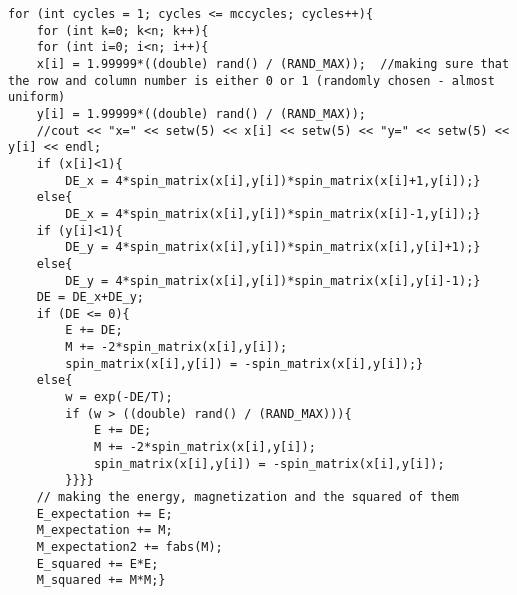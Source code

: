 \begin{lstlisting}
for (int cycles = 1; cycles <= mccycles; cycles++){
    for (int k=0; k<n; k++){
    for (int i=0; i<n; i++){
    x[i] = 1.99999*((double) rand() / (RAND_MAX));  //making sure that the row and column number is either 0 or 1 (randomly chosen - almost uniform)
    y[i] = 1.99999*((double) rand() / (RAND_MAX));
    //cout << "x=" << setw(5) << x[i] << setw(5) << "y=" << setw(5) << y[i] << endl;
    if (x[i]<1){
        DE_x = 4*spin_matrix(x[i],y[i])*spin_matrix(x[i]+1,y[i]);}
    else{
        DE_x = 4*spin_matrix(x[i],y[i])*spin_matrix(x[i]-1,y[i]);}
    if (y[i]<1){
        DE_y = 4*spin_matrix(x[i],y[i])*spin_matrix(x[i],y[i]+1);}
    else{
        DE_y = 4*spin_matrix(x[i],y[i])*spin_matrix(x[i],y[i]-1);}
    DE = DE_x+DE_y;
    if (DE <= 0){
        E += DE;
        M += -2*spin_matrix(x[i],y[i]);
        spin_matrix(x[i],y[i]) = -spin_matrix(x[i],y[i]);}
    else{
        w = exp(-DE/T);
        if (w > ((double) rand() / (RAND_MAX))){
            E += DE;
            M += -2*spin_matrix(x[i],y[i]);
            spin_matrix(x[i],y[i]) = -spin_matrix(x[i],y[i]);
        }}}}
    // making the energy, magnetization and the squared of them
    E_expectation += E;
    M_expectation += M;
    M_expectation2 += fabs(M); 
    E_squared += E*E;
    M_squared += M*M;}
\end{lstlisting}

